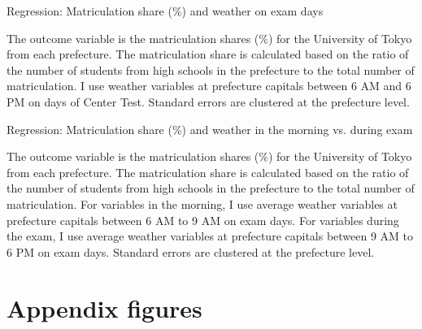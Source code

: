 \documentclass[12pt,letterpaper]{article}
\begin{document}
\begin{table}[H]
  \center
  \caption{Regression: Matriculation share (\%) and weather on exam days}
  
  \label{tab:main_reg}
  \small
  \begin{tablenotes}
    \item
      The outcome variable is the matriculation shares (\%) for the University of Tokyo from each prefecture.
      The matriculation share is calculated based on the ratio of the number of students from high schools in the prefecture to the total number of matriculation.
      I use weather variables at prefecture capitals between 6 AM and 6 PM on days of Center Test.
      Standard errors are clustered at the prefecture level.
  \end{tablenotes}
\end{table}

\begin{table}[H]
  \center
  \caption{Regression: Matriculation share (\%) and weather in the morning vs. during exam}
  \scriptsize
  
  \label{tab:reg_morning_exam}
  \scriptsize
  \begin{tablenotes}
    \item
      The outcome variable is the matriculation shares (\%) for the University of Tokyo from each prefecture.
      The matriculation share is calculated based on the ratio of the number of students from high schools in the prefecture to the total number of matriculation.
      For variables in the morning, I use average weather variables at prefecture capitals between 6 AM to 9 AM on exam days.
      For variables during the exam, I use average weather variables at prefecture capitals between 9 AM to 6 PM on exam days.
      Standard errors are clustered at the prefecture level.
  \end{tablenotes}
\end{table}


\appendix

\setcounter{figure}{0}
\setcounter{table}{0}
\renewcommand\thefigure{\Alph{section}.\arabic{figure}}
\renewcommand\thetable{\Alph{section}.\arabic{table}}
  
\section{Appendix figures}\label{sec:appendix_figure}
\end{document}
